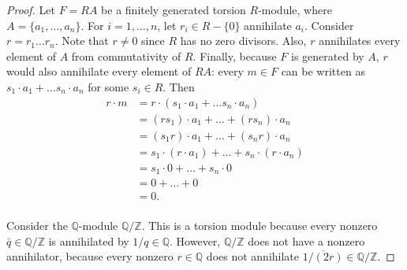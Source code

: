 \documentclass{article}
\begin{document}
  \begin{proof}
    Let $F=RA$ be a finitely generated torsion $R$-module, where
    $A=\{a_1,\ldots,a_n\}$. For $i=1,\ldots,n$, let $r_i\in R-\{0\}$
    annihilate $a_i$. Consider $r=r_1\ldots r_n$. Note that $r\neq0$ since
    $R$ has no zero divisors. Also, $r$ annihilates every element of $A$
    from commutativity of $R$. Finally, because $F$ is generated by $A$,
    $r$ would also annihilate every element of $RA$: every $m\in F$ can be
    written as $s_1\cdot a_1+\ldots s_n\cdot a_n$ for some $s_i\in R$. Then
    \begin{align*}
      r\cdot m &=r\cdot(s_1\cdot a_1+\ldots s_n\cdot a_n)\\
      &=(rs_1)\cdot a_1 +\ldots +(rs_n)\cdot a_n\\
      &=(s_1r)\cdot a_1 +\ldots +(s_nr)\cdot a_n\\
      &=s_1\cdot(r\cdot a_1) +\ldots +s_n\cdot(r\cdot a_n)\\
      &=s_1\cdot0 +\ldots +s_n\cdot0\\
      &=0 +\ldots +0\\
      &=0.\\
    \end{align*}

    Consider the $\mathbb{Q}$-module $\mathbb{Q}/\mathbb{Z}$. This is a
    torsion module because every nonzero $\bar{q}\in\mathbb{Q}/\mathbb{Z}$
    is annihilated by $1/q\in\mathbb{Q}$. However, $\mathbb{Q}/\mathbb{Z}$
    does not have a nonzero annihilator, because every nonzero
    $r\in\mathbb{Q}$ does not annihilate
    $\overline{1/(2r)}\in\mathbb{Q}/\mathbb{Z}$.
  \end{proof}
\end{document}
